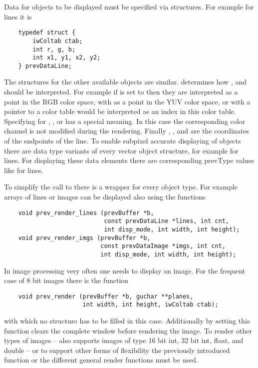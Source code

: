 Data for objects to be displayed must be specified via
structures. For example for lines it is
\begin{small}
\linespread{0.9}
\begin{verbatim}
    typedef struct {
        iwColtab ctab;
        int r, g, b;
        int x1, y1, x2, y2;
    } prevDataLine;
\end{verbatim}
\end{small}
The structures for the other available objects are similar. 
determines how ,  and  should be
interpreted. For example if  is set to  then
they are interpreted as a point in the RGB color space, with
 as a point in the YUV color space, or with a pointer
to a color table  would be interpreted as an index in this
color table. Specifying  for , , or  has
a special meaning. In this case the corresponding color channel is not
modified during the rendering. Finally , , 
and  are the coordinates of the endpoints of the line. To
enable subpixel accurate displaying of objects there are 
data type variants of every vector object structure, for
example  for lines. For displaying these
data elements there are corresponding prevType values like
 for lines.

To simplify the call to  there is a
wrapper for every object type. For example arrays of lines or images
can be displayed also using the functions
\begin{small}
\linespread{0.9}
\begin{verbatim}
    void prev_render_lines (prevBuffer *b,
                            const prevDataLine *lines, int cnt,
                            int disp_mode, int width, int height);
    void prev_render_imgs (prevBuffer *b,
                           const prevDataImage *imgs, int cnt,
                           int disp_mode, int width, int height);
\end{verbatim}
\end{small}
In image processing very often one needs to display an image. For
the frequent case of 8 bit images there is the function
\begin{small}
\linespread{0.9}
\begin{verbatim}
    void prev_render (prevBuffer *b, guchar **planes,
                      int width, int height, iwColtab ctab);
\end{verbatim}
\end{small}
with which no structure has to be filled in this case. Additionally
by setting  this function clears the complete
window before rendering the image. To render other types of images
-- \icewing{} also supports images of type 16 bit int, 32 bit int,
float, and double -- or to support other forms of flexibility
the previously introduced function  or
the different general render functions must be used.

